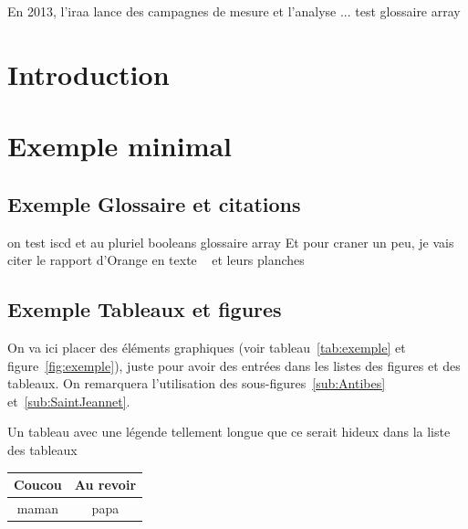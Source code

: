 		En 2013, l'\gls{iraa} lance des campagnes de mesure et l'analyse ...
		test glossaire \gls{array}


		
		\section{Introduction}

		\section{Exemple minimal}
			\subsection{Exemple Glossaire et citations}
			on test \gls{iscd} et au pluriel \glspl{boolean}
			glossaire \gls{array}
			Et pour craner un peu, je vais citer le rapport d'Orange en texte ~\citep{orangeTxt}  et leurs planches \citep{orangePl}

		
			\subsection{Exemple Tableaux et figures}
			On va ici placer des éléments graphiques (voir tableau~\ref{tab:exemple} et figure~\ref{fig:exemple}), juste pour avoir des entrées dans les listes des figures et des 	tableaux. On remarquera l'utilisation des sous-figures~\ref{sub:Antibes} et~\ref{sub:SaintJeannet}.
	
			\begin{tableth}
				\caption[Légende courte pour l'exemple de tableau]{Un tableau avec une légende tellement longue que ce serait hideux dans la liste des tableaux}
					\label{tab:exemple}
				\begin{tabular}{c|c}
					Coucou	& Au revoir\\
					\hline
					maman	& papa
				\end{tabular}
			\end{tableth}

